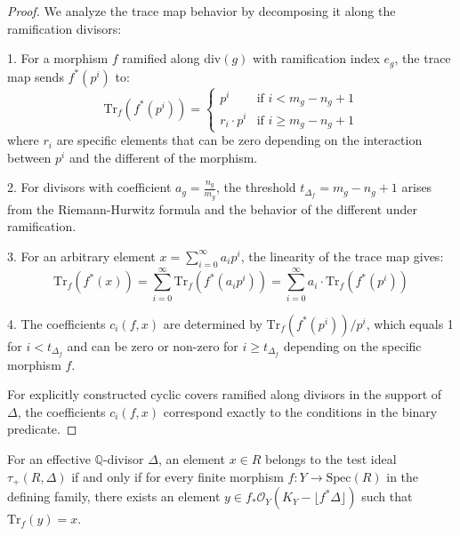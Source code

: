 \begin{proof}
We analyze the trace map behavior by decomposing it along the ramification divisors:

1. For a morphism $f$ ramified along $\text{div}(g)$ with ramification index $e_g$, the trace map sends $f^*(p^i)$ to:
   $$\text{Tr}_f(f^*(p^i)) = \begin{cases}
   p^i & \text{if } i < m_g - n_g + 1 \\
   r_i \cdot p^i & \text{if } i \geq m_g - n_g + 1
   \end{cases}$$
   where $r_i$ are specific elements that can be zero depending on the interaction between $p^i$ and the different of the morphism.

2. For divisors with coefficient $a_g = \frac{n_g}{m_g}$, the threshold $t_{\Delta_f} = m_g - n_g + 1$ arises from the Riemann-Hurwitz formula and the behavior of the different under ramification.

3. For an arbitrary element $x = \sum_{i=0}^{\infty} a_i p^i$, the linearity of the trace map gives:
   $$\text{Tr}_f(f^*(x)) = \sum_{i=0}^{\infty} \text{Tr}_f(f^*(a_i p^i)) = \sum_{i=0}^{\infty} a_i \cdot \text{Tr}_f(f^*(p^i))$$

4. The coefficients $c_i(f,x)$ are determined by $\text{Tr}_f(f^*(p^i))/p^i$, which equals 1 for $i < t_{\Delta_f}$ and can be zero or non-zero for $i \geq t_{\Delta_f}$ depending on the specific morphism $f$.

For explicitly constructed cyclic covers ramified along divisors in the support of $\Delta$, the coefficients $c_i(f,x)$ correspond exactly to the conditions in the binary predicate.
\end{proof}

\begin{theorem}\label{thm:trace-map-characterization}
For an effective $\mathbb{Q}$-divisor $\Delta$, an element $x \in R$ belongs to the test ideal $\tau_+(R,\Delta)$ if and only if for every finite morphism $f: Y \to \text{Spec}(R)$ in the defining family, there exists an element $y \in f_*\mathcal{O}_Y(K_Y - \lfloor f^*\Delta\rfloor)$ such that $\text{Tr}_f(y) = x$.
\end{theorem}

